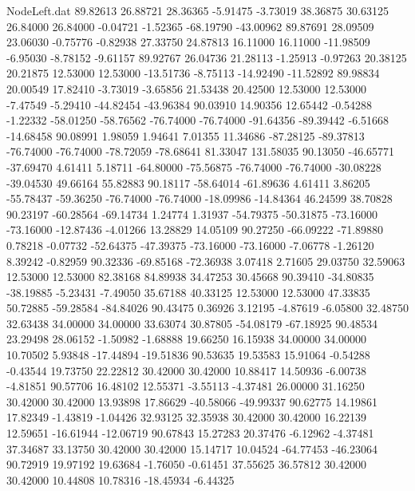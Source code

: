 \begin{filecontents}{NodeLeft.dat}
  89.82613   26.88721   28.36365    -5.91475   -3.73019   38.36875   30.63125   26.84000   26.84000   -0.04721   -1.52365  -68.19790  -43.00962
  89.87691   28.09509   23.06030    -0.75776   -0.82938   27.33750   24.87813   16.11000   16.11000  -11.98509   -6.95030   -8.78152   -9.61157
  89.92767   26.04736   21.28113    -1.25913   -0.97263   20.38125   20.21875   12.53000   12.53000  -13.51736   -8.75113  -14.92490  -11.52892
  89.98834   20.00549   17.82410    -3.73019   -3.65856   21.53438   20.42500   12.53000   12.53000   -7.47549   -5.29410  -44.82454  -43.96384
  90.03910   14.90356   12.65442    -0.54288   -1.22332  -58.01250  -58.76562  -76.74000  -76.74000  -91.64356  -89.39442   -6.51668  -14.68458
  90.08991    1.98059    1.94641     7.01355   11.34686  -87.28125  -89.37813  -76.74000  -76.74000  -78.72059  -78.68641   81.33047  131.58035
  90.13050  -46.65771  -37.69470     4.61411    5.18711  -64.80000  -75.56875  -76.74000  -76.74000  -30.08228  -39.04530   49.66164   55.82883
  90.18117  -58.64014  -61.89636     4.61411    3.86205  -55.78437  -59.36250  -76.74000  -76.74000  -18.09986  -14.84364   46.24599   38.70828
  90.23197  -60.28564  -69.14734     1.24774    1.31937  -54.79375  -50.31875  -73.16000  -73.16000  -12.87436   -4.01266   13.28829   14.05109
  90.27250  -66.09222  -71.89880     0.78218   -0.07732  -52.64375  -47.39375  -73.16000  -73.16000   -7.06778   -1.26120    8.39242   -0.82959
  90.32336  -69.85168  -72.36938     3.07418    2.71605   29.03750   32.59063   12.53000   12.53000   82.38168   84.89938   34.47253   30.45668
  90.39410  -34.80835  -38.19885    -5.23431   -7.49050   35.67188   40.33125   12.53000   12.53000   47.33835   50.72885  -59.28584  -84.84026
  90.43475    0.36926    3.12195    -4.87619   -6.05800   32.48750   32.63438   34.00000   34.00000   33.63074   30.87805  -54.08179  -67.18925
  90.48534   23.29498   28.06152    -1.50982   -1.68888   19.66250   16.15938   34.00000   34.00000   10.70502    5.93848  -17.44894  -19.51836
  90.53635   19.53583   15.91064    -0.54288   -0.43544   19.73750   22.22812   30.42000   30.42000   10.88417   14.50936   -6.00738   -4.81851
  90.57706   16.48102   12.55371    -3.55113   -4.37481   26.00000   31.16250   30.42000   30.42000   13.93898   17.86629  -40.58066  -49.99337
  90.62775   14.19861   17.82349    -1.43819   -1.04426   32.93125   32.35938   30.42000   30.42000   16.22139   12.59651  -16.61944  -12.06719
  90.67843   15.27283   20.37476    -6.12962   -4.37481   37.34687   33.13750   30.42000   30.42000   15.14717   10.04524  -64.77453  -46.23064
  90.72919   19.97192   19.63684    -1.76050   -0.61451   37.55625   36.57812   30.42000   30.42000   10.44808   10.78316  -18.45934   -6.44325

\end{filecontents}
